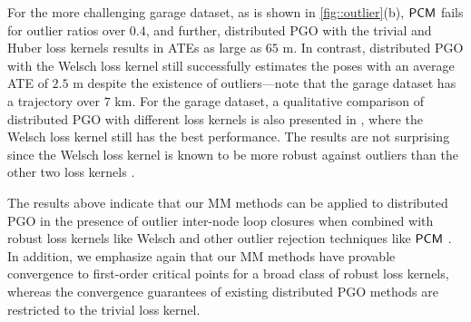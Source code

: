 \figgarage

For the more challenging {\sf garage} dataset, as is shown in \cref{fig::outlier}(b), $\mathsf{PCM}$ fails for {\highlight outlier ratios} over $0.4$, and further, distributed PGO with the trivial and Huber loss kernels results in ATEs as large as $65$ m. In contrast, distributed PGO with the Welsch loss kernel still successfully estimates the poses with an average ATE of $2.5$ m despite the existence of  outliers---note that the {\sf garage} dataset has a trajectory over $7$ km. For the {\sf garage} dataset, a qualitative comparison of distributed PGO with different loss kernels is also presented in , where the Welsch loss kernel still has the best performance. The results are not surprising since the Welsch loss kernel is known to be more robust against outliers than the other two loss kernels \cite{barron2019cvpr}.  



The results above indicate that our MM methods can be applied to distributed PGO in the presence of outlier inter-node loop closures when combined with robust loss kernels like Welsch and other outlier rejection techniques like $\mathsf{PCM}$ \cite{mangelson2018pairwise}. In addition, we emphasize again that our MM methods have provable convergence to first-order critical points for a broad class of robust loss kernels, whereas the convergence guarantees of existing distributed PGO methods \cite{choudhary2017distributed,tian2019distributed,tron2014distributed,eric2020geod} are restricted to the trivial loss kernel.